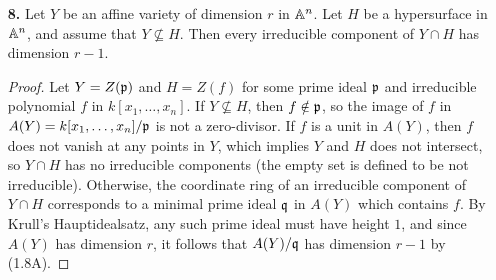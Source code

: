 \documentclass{article}
\begin{document}
\begin{enumerate} [label=\textbf{\arabic*.}, leftmargin=0em]
\begin{proof}
\begin{itemize} [leftmargin=0cm]
    \item[(b)] Suppose $X$ is not quasi-compact so that the set $\Sigma$ of non-quasi-compact closed subsets of $X$ is non-empty. Let $Y$ be a minimal element in $\Sigma$. If $U$ is an open subset of $Y$, then $A = \overline{U}$ and $B = Y - U$  are closed subsets of $X$ contained in $Y$ such that $Y = A \cup B$. Since $Y$ is minimal amongst the set of non-quasi-compact closed subsets in $X$,  $A$ and $B$ must be compact; however, a finite union of compact sets is compact, a contradiction.

    \item[(c)] Let $Y$ be a subspace of $X$. Then any open subset of $Y$ is of the form $V = U \cap Y$ for some open subset $U$ of $X$, so if $V_1 \subseteq V_2 \subseteq \cdots$ is an ascending chain of open sets in $Y$ with $V_i = U_i \cap Y$, then let $U_i' = \bigcup_{j \leq i} U_i$ so that we have the ascending chain $U_1' \subseteq U_2' \subseteq \cdots$ and
    \begin{equation*}
         U_i' \cap Y = \bigcup_{j \leq i} U_i \cap Y = \bigcup_{j \leq i} V_i = V_i.
    \end{equation*}
    If $X$ is noetherian, then this chain eventually terminates, say at $i = n$, which implies the chain $V_1 \subseteq V_2 \subseteq \cdots$ terminates at $V_n = U_n' \cap Y$. Hence, $Y$ is noetherian.

    \item[(d)] Every subspace of a noetherian space is compact since every subspace is noetherian, and in a Hausdorff space every compact set is closed, hence every subset is closed, therefore a noetherian Hausdorff space must be discrete. Finiteness follows from quasi-compactness.
   \end{itemize} 
\end{proof}

\item[\textbf{8.}] Let $Y$ be an affine variety of dimension $r$ in $\mathbb{A}^n$. Let $H$ be a hypersurface in $\mathbb{A}^n$, and assume that $Y \nsubseteq H$. Then every irreducible component of $Y \cap H$ has dimension $r - 1$.

\begin{proof}
    Let $Y = Z(\mathfrak{p})$ and $H = Z(f)$ for some prime ideal $\mathfrak{p}$ and irreducible polynomial $f$ in $k[x_1, \dots, x_n]$. If $Y \nsubseteq H$, then $f \notin \mathfrak{p}$, so the image of $f$ in $A(Y) = k[x_1, \dots, x_n] / \mathfrak{p}$ is not a zero-divisor. If $f$ is a unit in $A(Y)$, then $f$ does not vanish at any points in $Y$, which implies $Y$ and $H$ does not intersect, so $Y \cap H$ has no irreducible components (the empty set is defined to be not irreducible). Otherwise, the coordinate ring of an irreducible component of $Y \cap H$ corresponds to a minimal prime ideal $\mathfrak{q}$ in $A(Y)$ which contains $f$. By Krull's Hauptidealsatz, any such prime ideal must have height $1$, and since $A(Y)$ has dimension $r$, it follows that $A(Y) / \mathfrak{q}$ has dimension $r - 1$ by (1.8A).
\end{proof}


\end{enumerate}
\end{document}
